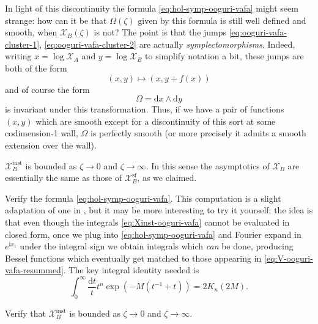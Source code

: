 \documentclass[12pt,letterpaper,reqno]{article}
\numberwithin{equation}{section}
\newcommand{\cX}{\ensuremath{\mathcal X}}
\newcommand{\I}{{\mathrm i}}
\newcommand{\de}{\mathrm{d}}
\renewcommand{\sf}{\mathrm{sf}}
\newcommand{\inst}{\mathrm{inst}}
\newcommand{\ti}[1]{\textit{#1}}
\begin{document}
\begin{example}
In light of this discontinuity the formula  \eqref{eq:hol-symp-ooguri-vafa}
might seem strange: how can it be that $\Omega(\zeta)$ given by this 
formula is still well defined and smooth, when $\cX_B(\zeta)$ is not?
The point is that the jumps \eqref{eq:ooguri-vafa-cluster-1}, 
\eqref{eq:ooguri-vafa-cluster-2} are actually \ti{symplectomorphisms}.
Indeed, writing $x = \log \cX_A$ and $y = \log \cX_B$ to 
simplify notation a bit, these jumps are both of the form
\begin{equation}
  (x,y) \mapsto (x,y + f(x))
\end{equation}
and of course the form
\begin{equation}
  \Omega = \de x \wedge \de y
\end{equation}
is invariant under this transformation. Thus, if we have a pair
of functions $(x,y)$ which are smooth except for 
a discontinuity of this sort at some codimension-1 wall,
$\Omega$ is perfectly smooth (or more precisely it admits a
smooth extension over the wall).

$\cX_B^\inst$ is bounded as $\zeta \to 0$ and $\zeta \to \infty$.
In this sense the asymptotics of $\cX_B$ are essentially the 
same as those of $\cX_B^\sf$, as we claimed.

\end{example}

\begin{exercise} \label{exc:ov-check-symplectic} 
Verify the formula \eqref{eq:hol-symp-ooguri-vafa}.
This computation is a slight adaptation of one in 
\cite{Gaiotto:2008cd}, but it may be more interesting to try
it yourself; the idea is that even though the integrals
\eqref{eq:Xinst-ooguri-vafa} cannot
be evaluated in closed form, once we plug into \eqref{eq:hol-symp-ooguri-vafa}
and Fourier expand in $e^{\I x_1}$ under the integral sign
we obtain integrals which \ti{can} be done,
producing Bessel functions which eventually get matched to those appearing
in \eqref{eq:V-ooguri-vafa-resummed}.
The key integral identity needed is
\begin{equation} \label{eq:bessel-integral-identity}
 \int_{0}^\infty \frac{\de t}{t} t^n \exp \left( -M (t^{-1} + t) \right) = 2 K_{n}(2 M).
\end{equation}

\end{exercise}

\begin{exercise} Verify that $\cX_B^\inst$ is bounded as $\zeta \to 0$ and $\zeta \to \infty$.
\end{exercise}
\end{document}

